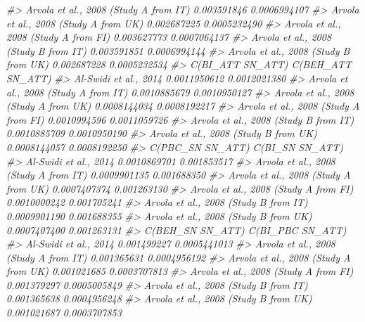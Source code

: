 \documentclass[
]{book}
\newenvironment{Shaded}{\begin{snugshade}}{\end{snugshade}}
\newcommand{\CommentTok}[1]{\textcolor[rgb]{0.56,0.35,0.01}{\textit{#1}}}
\begin{document}
\begin{Shaded}
\begin{Highlighting}[]
\CommentTok{\#\textgreater{} Arvola et al., 2008 (Study A from IT)      0.003591846      0.0006994107}
\CommentTok{\#\textgreater{} Arvola et al., 2008 (Study A from UK)      0.002687225      0.0005232490}
\CommentTok{\#\textgreater{} Arvola et al., 2008 (Study A from FI)      0.003627773      0.0007064137}
\CommentTok{\#\textgreater{} Arvola et al., 2008 (Study B from IT)      0.003591851      0.0006994144}
\CommentTok{\#\textgreater{} Arvola et al., 2008 (Study B from UK)      0.002687228      0.0005232534}
\CommentTok{\#\textgreater{}                                       C(BI\_ATT SN\_ATT) C(BEH\_ATT SN\_ATT)}
\CommentTok{\#\textgreater{} Al{-}Swidi et al., 2014                     0.0011950612      0.0012021380}
\CommentTok{\#\textgreater{} Arvola et al., 2008 (Study A from IT)     0.0010885679      0.0010950127}
\CommentTok{\#\textgreater{} Arvola et al., 2008 (Study A from UK)     0.0008144034      0.0008192217}
\CommentTok{\#\textgreater{} Arvola et al., 2008 (Study A from FI)     0.0010994596      0.0011059726}
\CommentTok{\#\textgreater{} Arvola et al., 2008 (Study B from IT)     0.0010885709      0.0010950190}
\CommentTok{\#\textgreater{} Arvola et al., 2008 (Study B from UK)     0.0008144057      0.0008192250}
\CommentTok{\#\textgreater{}                                       C(PBC\_SN SN\_ATT) C(BI\_SN SN\_ATT)}
\CommentTok{\#\textgreater{} Al{-}Swidi et al., 2014                     0.0010869701     0.001853517}
\CommentTok{\#\textgreater{} Arvola et al., 2008 (Study A from IT)     0.0009901135     0.001688350}
\CommentTok{\#\textgreater{} Arvola et al., 2008 (Study A from UK)     0.0007407374     0.001263130}
\CommentTok{\#\textgreater{} Arvola et al., 2008 (Study A from FI)     0.0010000242     0.001705241}
\CommentTok{\#\textgreater{} Arvola et al., 2008 (Study B from IT)     0.0009901190     0.001688355}
\CommentTok{\#\textgreater{} Arvola et al., 2008 (Study B from UK)     0.0007407400     0.001263131}
\CommentTok{\#\textgreater{}                                       C(BEH\_SN SN\_ATT) C(BI\_PBC SN\_ATT)}
\CommentTok{\#\textgreater{} Al{-}Swidi et al., 2014                      0.001499227     0.0005441013}
\CommentTok{\#\textgreater{} Arvola et al., 2008 (Study A from IT)      0.001365631     0.0004956192}
\CommentTok{\#\textgreater{} Arvola et al., 2008 (Study A from UK)      0.001021685     0.0003707813}
\CommentTok{\#\textgreater{} Arvola et al., 2008 (Study A from FI)      0.001379297     0.0005005849}
\CommentTok{\#\textgreater{} Arvola et al., 2008 (Study B from IT)      0.001365638     0.0004956248}
\CommentTok{\#\textgreater{} Arvola et al., 2008 (Study B from UK)      0.001021687     0.0003707853}

\end{Highlighting}
\end{Shaded}
\end{document}
